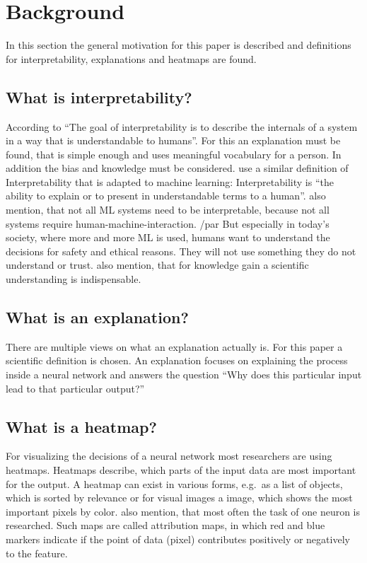\section{Background}
In this section the general motivation for this paper is described and definitions for interpretability, explanations and heatmaps are found.

\subsection{What is interpretability?}
According to  “The goal of interpretability is to describe the internals of a system in a way that is understandable to humans”. For this an explanation must be found, that is simple enough and uses meaningful vocabulary for a person. In addition the bias and knowledge must be considered.
 use a similar definition of Interpretability that is adapted to machine learning: Interpretability is “the ability to explain or to present in understandable terms to a human”.  also mention, that not all ML systems need to be interpretable, because not all systems require human-machine-interaction. 
/par
But especially in today's society, where more and more ML is used, humans want to understand the decisions for safety and ethical reasons. They will not use something they do not understand or trust.
 also mention, that for knowledge gain a scientific understanding is indispensable.

\subsection{What is an explanation?}
There are multiple views on what an explanation actually is. For this paper a scientific definition is chosen. An explanation focuses on explaining the process inside a neural network and answers the question “Why does this particular input lead to that particular output?”~\cite[2]{Gilpin.2018}

\subsection{What is a heatmap?} 
For visualizing the decisions of a neural network most researchers are using heatmaps. Heatmaps describe, which parts of the input data are most important for the output. A heatmap can exist in various forms, e.g.\ as a list of objects, which is sorted by relevance or for visual images a image, which shows the most important pixels by color. \Cite{Ancona.2018} also mention, that most often the task of one neuron is researched. Such maps are called attribution maps, in which red and blue markers indicate if the point of data (pixel) contributes positively or negatively to the feature.
